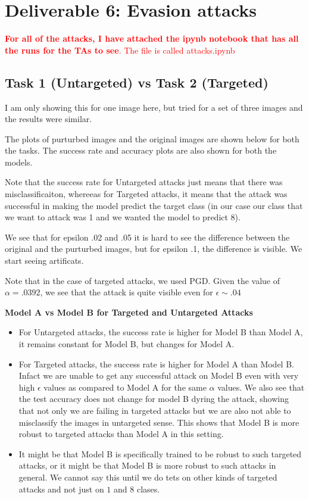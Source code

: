 
\section{Deliverable 6: Evasion attacks}

\textcolor{red}{\textbf{For all of the attacks, I have attached the ipynb notebook that has all the runs for the TAs to see}. The file is called attacks.ipynb}

\subsection{Task 1 (Untargeted) vs Task 2 (Targeted)}


\begin{solve}

I am only showing this for one image here, but tried for a set of three images and the results were similar.

The plots of purturbed images and the original images are shown below for both the tasks. The success rate and accuracy plots are also shown for both the models.

Note that the success rate for Untargeted attacks just means that there was misclassificaiton, whereeas for Targeted attacks, it means that the attack was successful in making the model predict the target class (in our case our class that we want to attack was 1 and we wanted the model to predict 8). 

We see that for epsilon .02 and .05 it is hard to see the difference between the original and the purturbed images, but for epsilon .1, the difference is visible. We start seeing artificats.

Note that in the case of targeted attacks, we used PGD. Given the value of $\alpha = .0392$, we see that the attack is quite visible even for $\epsilon \sim .04$


\textbf{Model A vs Model B for Targeted and Untargeted Attacks}
\begin{itemize}
    \item For Untargeted attacks, the success rate is higher for Model B than Model A, it remains constant for Model B, but changes for Model A.
    \item For Targeted attacks, the success rate is higher for Model A than Model B. Infact we are unable to get any successful attack on Model B even with very high $\epsilon$ values as compared to Model A for the same $\alpha$ values.
    We also see that the test accuracy does not change for model B dyring the attack, showing that not only we are failing in targeted attacks but we are also not able to misclassify the images in untargeted sense.
    This shows that Model B is more robust to targeted attacks than Model A in this setting.
    \item It might be that Model B is specifically trained to be robust to such targeted attacks, or it might be that Model B is more robust to such attacks in general. We cannot say this until we do tets on other kinds of targeted attacks and not just on $1$ and $8$ clases.
\end{itemize}



\end{solve}
